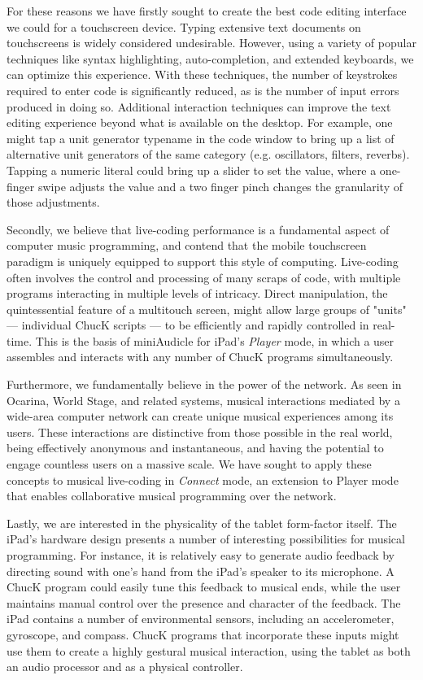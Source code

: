 \documentclass{article}
\begin{document}
For these reasons we have firstly sought to create the best code editing interface we could for a touchscreen device. 
Typing extensive text documents on touchscreens is widely considered undesirable. 
However, using a variety of popular techniques like syntax highlighting, auto-completion, and extended keyboards, we can optimize this experience.
With these techniques, the number of keystrokes required to enter code is significantly reduced, as is the number of input errors produced in doing so. 
Additional interaction techniques can improve the text editing experience beyond what is available on the desktop. 
For example, one might tap a unit generator typename in the code window to bring up a list of alternative unit generators of the same category (e.g. oscillators, filters, reverbs). 
Tapping a numeric literal could bring up a slider to set the value, where a one-finger swipe adjusts the value and a two finger pinch changes the granularity of those adjustments. 

Secondly, we believe that live-coding performance is a fundamental aspect of computer music programming, and contend that the mobile touchscreen paradigm is uniquely equipped to support this style of computing. 
Live-coding often involves the control and processing of many scraps of code, with multiple programs interacting in multiple levels of intricacy. 
Direct manipulation, the quintessential feature of a multitouch screen, might allow large groups of "units" --- individual ChucK scripts --- to be efficiently and rapidly controlled in real-time. 
This is the basis of miniAudicle for iPad's \textit{Player} mode, in which a user assembles and interacts with any number of ChucK programs simultaneously. 

Furthermore, we fundamentally believe in the power of the network. 
As seen in Ocarina, World Stage, and related systems, musical interactions mediated by a wide-area computer network can create unique musical experiences among its users. 
These interactions are distinctive from those possible in the real world, being effectively anonymous and instantaneous, and having the potential to engage countless users on a massive scale. 
We have sought to apply these concepts to musical live-coding in \textit{Connect} mode, an extension to Player mode that enables collaborative musical programming over the network. 

Lastly, we are interested in the physicality of the tablet form-factor itself. 
The iPad's hardware design presents a number of interesting possibilities for musical programming. 
For instance, it is relatively easy to generate audio feedback by directing sound with one's hand from the iPad's speaker to its microphone. 
A ChucK program could easily tune this feedback to musical ends, while the user  maintains manual control over the presence and character of the feedback. 
The iPad contains a number of environmental sensors, including an accelerometer, gyroscope, and compass. 
ChucK programs that incorporate these inputs might use them to create a highly gestural musical interaction, using the tablet as both an audio processor and as a physical controller. 
\end{document}
